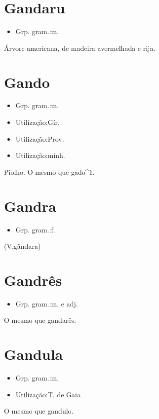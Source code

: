 \section{Gandaru}
\begin{itemize}
\item {Grp. gram.:m.}
\end{itemize}
Árvore americana, de madeira avermelhada e rija.
\section{Gando}
\begin{itemize}
\item {Grp. gram.:m.}
\end{itemize}
\begin{itemize}
\item {Utilização:Gír.}
\end{itemize}
\begin{itemize}
\item {Utilização:Prov.}
\end{itemize}
\begin{itemize}
\item {Utilização:minh.}
\end{itemize}
Piolho.
O mesmo que \textunderscore gado\textunderscore ^1.
\section{Gandra}
\begin{itemize}
\item {Grp. gram.:f.}
\end{itemize}
(V.gândara)
\section{Gandrês}
\begin{itemize}
\item {Grp. gram.:m.  e  adj.}
\end{itemize}
O mesmo que \textunderscore gandarês\textunderscore .
\section{Gandula}
\begin{itemize}
\item {Grp. gram.:m.}
\end{itemize}
\begin{itemize}
\item {Utilização:T. de Gaia}
\end{itemize}
O mesmo que \textunderscore gandulo\textunderscore .
